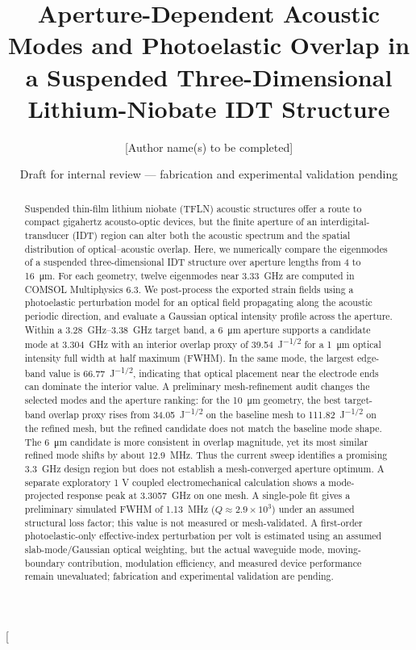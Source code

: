 \documentclass[10pt,twocolumn]{article}
\title{\bfseries Aperture-Dependent Acoustic Modes and Photoelastic Overlap in a Suspended Three-Dimensional Lithium-Niobate IDT Structure}
\author[1]{[Author name(s) to be completed]}
\affil[1]{[Affiliation(s) to be completed]}
\date{\small Draft for internal review --- fabrication and experimental validation pending}
\begin{document}
\twocolumn[\maketitle
\begin{center}\end{center}
\begin{abstract}
Suspended thin-film lithium niobate (TFLN) acoustic structures offer a route to compact gigahertz acousto-optic devices, but the finite aperture of an interdigital-transducer (IDT) region can alter both the acoustic spectrum and the spatial distribution of optical--acoustic overlap. Here, we numerically compare the eigenmodes of a suspended three-dimensional IDT structure over aperture lengths from 4 to \SI{16}{\micro\meter}. For each geometry, twelve eigenmodes near \SI{3.33}{\giga\hertz} are computed in COMSOL Multiphysics 6.3. We post-process the exported strain fields using a photoelastic perturbation model for an optical field propagating along the acoustic periodic direction, and evaluate a Gaussian optical intensity profile across the aperture. Within a \SIrange{3.28}{3.38}{\giga\hertz} target band, a \SI{6}{\micro\meter} aperture supports a candidate mode at \SI{3.304}{\giga\hertz} with an interior overlap proxy of \SI{39.54}{\joule^{-1/2}} for a \SI{1}{\micro\meter} optical intensity full width at half maximum (FWHM). In the same mode, the largest edge-band value is \SI{66.77}{\joule^{-1/2}}, indicating that optical placement near the electrode ends can dominate the interior value. A preliminary mesh-refinement audit changes the selected modes and the aperture ranking: for the \SI{10}{\micro\meter} geometry, the best target-band overlap proxy rises from \SI{34.05}{\joule^{-1/2}} on the baseline mesh to \SI{111.82}{\joule^{-1/2}} on the refined mesh, but the refined candidate does not match the baseline mode shape. The \SI{6}{\micro\meter} candidate is more consistent in overlap magnitude, yet its most similar refined mode shifts by about \SI{12.9}{\mega\hertz}. Thus the current sweep identifies a promising \SI{3.3}{\giga\hertz} design region but does not establish a mesh-converged aperture optimum. A separate exploratory 1 V coupled electromechanical calculation shows a mode-projected response peak at \SI{3.3057}{\giga\hertz} on one mesh. A single-pole fit gives a preliminary simulated FWHM of \SI{1.13}{\mega\hertz} ($Q\approx2.9\times10^3$) under an assumed structural loss factor; this value is not measured or mesh-validated. A first-order photoelastic-only effective-index perturbation per volt is estimated using an assumed slab-mode/Gaussian optical weighting, but the actual waveguide mode, moving-boundary contribution, modulation efficiency, and measured device performance remain unevaluated; fabrication and experimental validation are pending.
\end{abstract}
\end{document}
